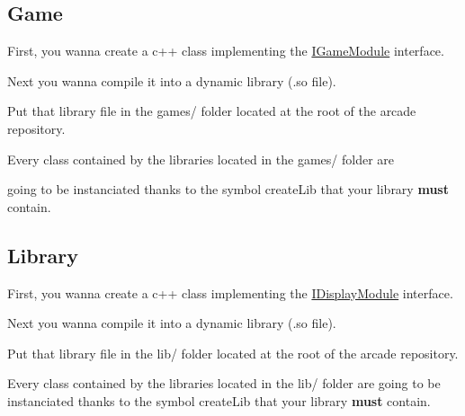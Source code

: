 \subsection*{Game}


\begin{DoxyItemize}
\item First, you wanna create a c++ class implementing the \mbox{\hyperlink{classArcade_1_1Games_1_1IGameModule}{I\+Game\+Module}} interface.
\item Next you wanna compile it into a dynamic library (.so file).
\item Put that library file in the {\ttfamily games/} folder located at the root of the arcade repository.
\end{DoxyItemize}

Every class contained by the libraries located in the {\ttfamily games/} folder are

going to be instanciated thanks to the symbol {\ttfamily create\+Lib} that your library {\bfseries{must}} contain.


\begin{DoxyCode}{0}
\DoxyCodeLine{\{}
\DoxyCodeLine{\}}
\end{DoxyCode}


\subsection*{Library}


\begin{DoxyItemize}
\item First, you wanna create a c++ class implementing the \mbox{\hyperlink{classArcade_1_1Display_1_1IDisplayModule}{I\+Display\+Module}} interface.
\item Next you wanna compile it into a dynamic library (.so file).
\item Put that library file in the {\ttfamily lib/} folder located at the root of the arcade repository.
\end{DoxyItemize}

Every class contained by the libraries located in the {\ttfamily lib/} folder are going to be instanciated thanks to the symbol {\ttfamily create\+Lib} that your library {\bfseries{must}} contain.


\begin{DoxyCode}{0}
\DoxyCodeLine{\{}
\DoxyCodeLine{\}}
\end{DoxyCode}
 